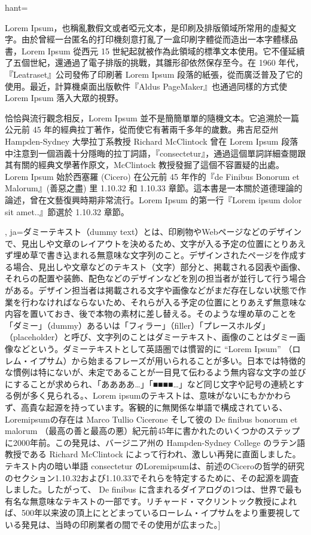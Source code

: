 hant={Lorem Ipsum，也稱亂數假文或者啞元文本，是印刷及排版領域所常用的虛擬文字。由於曾經一台匿名的打印機刻意打亂了一盒印刷字體從而造出一本字體樣品書，Lorem Ipsum 從西元 15 世紀起就被作為此領域的標準文本使用。它不僅延續了五個世紀，還通過了電子排版的挑戰，其雛形卻依然保存至今。在 1960 年代，『Leatraset』公司發佈了印刷著 Lorem Ipsum 段落的紙張，從而廣泛普及了它的使用。最近，計算機桌面出版軟件『Aldus PageMaker』也通過同樣的方式使 Lorem Ipsum 落入大眾的視野。\par 恰恰與流行觀念相反，Lorem Ipsum 並不是簡簡單單的隨機文本。它追溯於一篇公元前 45 年的經典拉丁著作，從而使它有著兩千多年的歲數。弗吉尼亞州 Hampden-Sydney 大學拉丁系教授 Richard McClintock 曾在 Lorem Ipsum 段落中注意到一個涵義十分隱晦的拉丁詞語，『consectetur』，通過這個單詞詳細查閱跟其有關的經典文學著作原文，McClintock 教授發掘了這個不容置疑的出處。Lorem Ipsum 始於西塞羅 (Cicero) 在公元前 45 年作的『de Finibus Bonorum et Malorum』(善惡之盡) 里 1.10.32 和 1.10.33 章節。這本書是一本關於道德理論的論述，曾在文藝復興時期非常流行。Lorem Ipsum 的第一行『Lorem ipsum dolor sit amet..』節選於 1.10.32 章節。},
ja={ダミーテキスト（dummy text）とは、印刷物やWebページなどのデザインで、見出しや文章のレイアウトを決めるため、文字が入る予定の位置にとりあえず埋め草で書き込まれる無意味な文字列のこと。デザインされたページを作成する場合、見出しや文章などのテキスト（文字）部分と、掲載される図表や画像、それらの配置や装飾、配色などのデザインなどを別の担当者が並行して行う場合がある。デザイン担当者は掲載される文字や画像などがまだ存在しない状態で作業を行わなければならないため、それらが入る予定の位置にとりあえず無意味な内容を置いておき、後で本物の素材に差し替える。そのような埋め草のことを「ダミー」（dummy）あるいは「フィラー」（filler）「プレースホルダ」（placeholder）と呼び、文字列のことはダミーテキスト、画像のことはダミー画像などという。ダミーテキストとして英語圏では慣習的に “Lorem Ipsum” （ロレム・イプサム）から始まるフレーズが用いられることが多い。日本では特徴的な慣例は特にないが、未定であることが一目見て伝わるよう無内容な文字の並びにすることが求められ、「ああああ…」「■■■■…」など同じ文字や記号の連続とする例が多く見られる。、Lorem ipsumのテキストは、意味がないにもかかわらず、高貴な起源を持っています。客観的に無関係な単語で構成されている、Loremipsumの存在は Marco Tullio Cicerone そして彼の De finibus bonorum et malorum （最高の善と最高の悪）紀元前45年に書かれたのいくつかのステップに2000年前。この発見は、バージニア州の Hampden-Sydney College のラテン語教授である Richard McClintock によって行われ、激しい再発に直面しました。テキスト内の暗い単語 consectetur のLoremipsumは、前述のCiceroの哲学的研究のセクション1.10.32および1.10.33でそれらを特定するために、その起源を調査しました。したがって、 De finibus に含まれるダイアログの1つは、世界で最も有名な無意味なテキストの一部です。リチャード・マクリントック教授によれば、500年以来波の頂上にとどまっているローレム・イプサムをより重要視している発見は、当時の印刷業者の間でその使用が広まった。}]

